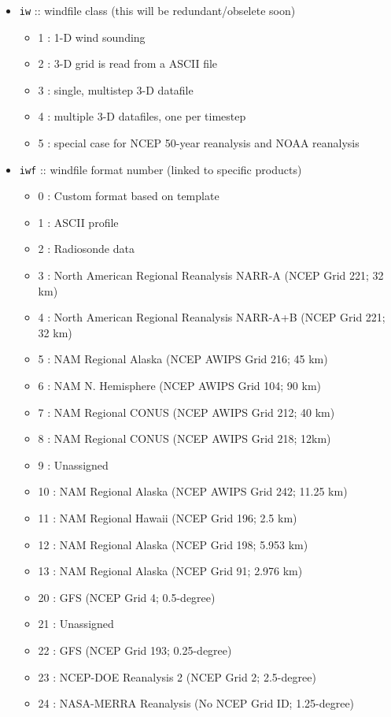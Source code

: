 \documentclass[11pt]{article}   %
\begin{document}
\begin{itemize}
\item \texttt{iw} :: windfile class (this will be redundant/obselete soon)
 \begin{itemize}
 \item 1 : 1-D wind sounding
 \item 2 : 3-D grid is read from a ASCII file
 \item 3 : single, multistep 3-D datafile
 \item 4 : multiple 3-D datafiles, one per timestep
 \item 5 : special case for NCEP 50-year reanalysis and NOAA reanalysis
 \end{itemize}
\item \texttt{iwf} :: windfile format number (linked to specific products)
 \begin{itemize}
 \item   0 : Custom format based on template
 \item   1 : ASCII profile
 \item   2 : Radiosonde data
 \item   3 : North American Regional Reanalysis NARR-A (NCEP Grid 221; 32 km)
 \item   4 : North American Regional Reanalysis NARR-A+B (NCEP Grid 221; 32 km)
 \item   5 : NAM Regional Alaska (NCEP AWIPS Grid 216; 45 km)
 \item   6 : NAM N. Hemisphere (NCEP AWIPS Grid 104; 90 km)
 \item   7 : NAM Regional CONUS (NCEP AWIPS Grid 212; 40 km)
 \item   8 : NAM Regional CONUS (NCEP AWIPS Grid 218; 12km)
 \item   9 : Unassigned
 \item  10 : NAM Regional Alaska (NCEP AWIPS Grid 242; 11.25 km)
 \item  11 : NAM Regional Hawaii (NCEP Grid 196; 2.5 km)
 \item  12 : NAM Regional Alaska (NCEP Grid 198; 5.953 km)
 \item  13 : NAM Regional Alaska (NCEP Grid 91; 2.976 km)
 \item  20 : GFS (NCEP Grid 4; 0.5-degree)
 \item  21 : Unassigned
 \item  22 : GFS (NCEP Grid 193; 0.25-degree)
 \item  23 : NCEP-DOE Reanalysis 2 (NCEP Grid 2; 2.5-degree)
 \item  24 : NASA-MERRA Reanalysis (No NCEP Grid ID; 1.25-degree)

\end{itemize}
\end{itemize}
\end{document}

